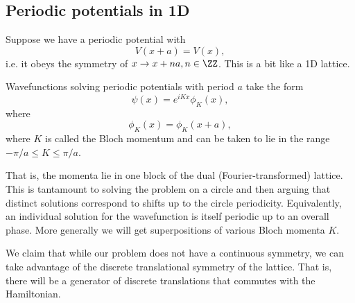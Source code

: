 \subsection*{Periodic potentials in 1D}
Suppose we have a periodic potential  with
\begin{equation}
    V(x+a) =V(x),
\end{equation}
i.e. it obeys the symmetry of $x\to x+na, n\in \ZZ$. This is a bit like a 1D lattice.
\begin{claim}
    Wavefunctions solving periodic potentials with period $a$ take the form
    \begin{equation}
        \psi(x) = e^{iKx} \phi_K (x),
    \end{equation}
    where
    \begin{equation}
        \phi_K(x)  = \phi_K(x+a),
    \end{equation}
    where $K$ is called the Bloch momentum and can be taken to lie in the range $-\pi/a \leq K \leq \pi/a$.
\end{claim}
That is, the momenta lie in one block of the dual (Fourier-transformed) lattice. This is tantamount to solving the problem on a circle and then arguing that distinct solutions correspond to shifts up to the circle periodicity. Equivalently, an individual solution for the wavefunction is itself periodic up to an overall phase. More generally we will get superpositions of various Bloch momenta $K$.

We claim that while our problem does not have a continuous symmetry, we can take advantage of the discrete translational symmetry of the lattice. That is, there will be a generator of discrete translations that commutes with the Hamiltonian.

